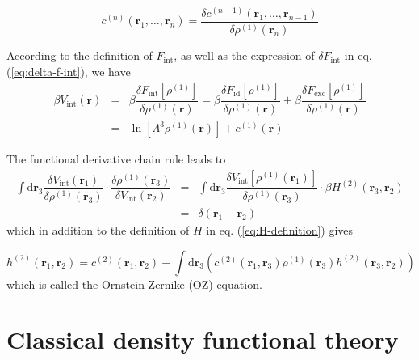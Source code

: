 \begin{equation}
c^{(n)}(\mathbf{r}_{1},\ldots,\mathbf{r}_{n})=\dfrac{\delta c^{(n-1)}(\mathbf{r}_{1},\ldots,\mathbf{r}_{n-1})}{\delta\rho^{(1)}(\mathbf{r}_{n})}
\end{equation}

According to the definition of $F_{\mathrm{int}}$, as well as the
expression of $\delta F_{\mathrm{int}}$ in eq. (\ref{eq:delta-f-int}),
we have
\begin{eqnarray}
\beta V_{\mathrm{int}}(\mathbf{r}) & = & \beta\dfrac{\delta F_{\mathrm{int}}[\rho^{(1)}]}{\delta\rho^{(1)}(\mathbf{r})}=\beta\dfrac{\delta F_{\mathrm{id}}[\rho^{(1)}]}{\delta\rho^{(1)}(\mathbf{r})}+\beta\dfrac{\delta F_{\mathrm{exc}}[\rho^{(1)}]}{\delta\rho^{(1)}(\mathbf{r})}\nonumber \\
 & = & \ln\left[\Lambda^{3}\rho^{(1)}(\mathbf{r})\right]+c^{(1)}(\mathbf{r})
\end{eqnarray}

The functional derivative chain rule leads to
\begin{eqnarray}
\int\mathrm{d}\mathbf{r}_{3}\dfrac{\delta V_{\mathrm{int}}(\mathbf{r}_{1})}{\delta\rho^{(1)}(\mathbf{r}_{3})}\cdot\dfrac{\delta\rho^{(1)}(\mathbf{r}_{3})}{\delta V_{\mathrm{int}}(\mathbf{r}_{2})} & = & \int\mathrm{d}\mathbf{r}_{3}\dfrac{\delta V_{\mathrm{int}}[\rho^{(1)}(\mathbf{r}_{1})]}{\delta\rho^{(1)}(\mathbf{r}_{3})}\cdot\beta H^{(2)}(\mathbf{r}_{3},\mathbf{r}_{2})\nonumber \\
 & = & \delta(\mathbf{r}_{1}-\mathbf{r}_{2})
\end{eqnarray}
which in addition to the definition of $H$ in eq. (\ref{eq:H-definition})
gives

\begin{equation}
h^{(2)}(\mathbf{r}_{1},\mathbf{r}_{2})=c^{(2)}(\mathbf{r}_{1},\mathbf{r}_{2})+\int\mathrm{d}\mathbf{r}_{3}\left(c^{(2)}(\mathbf{r}_{1},\mathbf{r}_{3})\rho^{(1)}(\mathbf{r}_{3})h^{(2)}(\mathbf{r}_{3},\mathbf{r}_{2})\right)\label{eq:oz-origine}
\end{equation}
which is called the Ornstein-Zernike (\acs{OZ}) equation. 

\section{Classical density functional theory}

